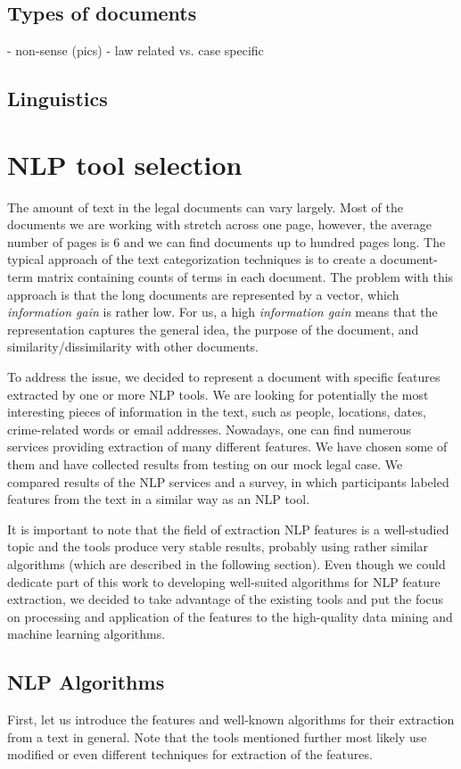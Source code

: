 \documentclass[
  digital, %
  table,   %
  lof,     %
  lot,     %
]{fithesis3}
\begin{document}
\section{Types of documents}
- non-sense (pics)
- law related vs. case specific
\section{Linguistics}


\chapter{NLP tool selection}
The amount of text in the legal documents can vary largely.
Most of the documents we are working with stretch across one page, however, the average number of pages is 6 and we can find documents up to hundred pages long.
The typical approach of the text categorization techniques is to create a document-term matrix containing counts of terms in each document.
The problem with this approach is that the long documents are represented by a vector, which \emph{information gain} is rather low.
For us, a high \emph{information gain} means that the representation captures the general idea, the purpose of the document, and similarity/dissimilarity with other documents.

To address the issue, we decided to represent a document with specific features extracted by one or more NLP tools.
We are looking for potentially the most interesting pieces of information in the text, such as people, locations, dates, crime-related words or email addresses.
Nowadays, one can find numerous services providing extraction of many different features.
We have chosen some of them and have collected results from testing on our mock legal case.
We compared results of the NLP services and a survey, in which participants labeled features from the text in a similar way as an NLP tool.

It is important to note that the field of extraction NLP features is a well-studied topic and the tools produce very stable results, probably using rather similar algorithms (which are described in the following section). Even though we could dedicate part of this work to developing well-suited algorithms for NLP feature extraction, we decided to take advantage of the existing tools and put the focus on processing and application of the features to the high-quality data mining and machine learning algorithms. 

\section{NLP Algorithms}
First, let us introduce the features and well-known algorithms for their extraction from a text in general.
Note that the tools mentioned further most likely use modified or even different techniques for extraction of the features.
\end{document}
